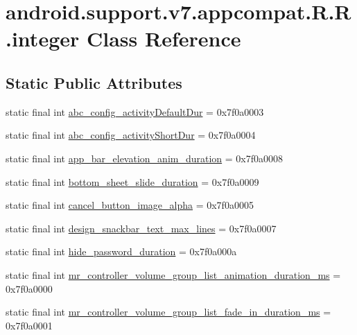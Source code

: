 \hypertarget{classandroid_1_1support_1_1v7_1_1appcompat_1_1_r_1_1integer}{
\section{android.support.v7.appcompat.R.R.integer Class Reference}
\label{classandroid_1_1support_1_1v7_1_1appcompat_1_1_r_1_1integer}
}
\subsection*{Static Public Attributes}
\begin{CompactItemize}
\item 
static final int \hyperlink{classandroid_1_1support_1_1v7_1_1appcompat_1_1_r_1_1integer_f3179c672ed6f17e5b76ba538b10bbd8}{abc\_\-config\_\-activityDefaultDur} = 0x7f0a0003
\item 
static final int \hyperlink{classandroid_1_1support_1_1v7_1_1appcompat_1_1_r_1_1integer_199e1cf937411d1077fac8e1bf773821}{abc\_\-config\_\-activityShortDur} = 0x7f0a0004
\item 
static final int \hyperlink{classandroid_1_1support_1_1v7_1_1appcompat_1_1_r_1_1integer_6e2a8706dfe0a7994482f85a407a47ef}{app\_\-bar\_\-elevation\_\-anim\_\-duration} = 0x7f0a0008
\item 
static final int \hyperlink{classandroid_1_1support_1_1v7_1_1appcompat_1_1_r_1_1integer_f9241fdb9204d08edf97eed474d79a49}{bottom\_\-sheet\_\-slide\_\-duration} = 0x7f0a0009
\item 
static final int \hyperlink{classandroid_1_1support_1_1v7_1_1appcompat_1_1_r_1_1integer_040b827424a99cd9db063513e1e36a93}{cancel\_\-button\_\-image\_\-alpha} = 0x7f0a0005
\item 
static final int \hyperlink{classandroid_1_1support_1_1v7_1_1appcompat_1_1_r_1_1integer_e3e76a674518ffb4240f729e3f8e05fc}{design\_\-snackbar\_\-text\_\-max\_\-lines} = 0x7f0a0007
\item 
static final int \hyperlink{classandroid_1_1support_1_1v7_1_1appcompat_1_1_r_1_1integer_99902b7e1f30f5e87fc2f6cecba4afb1}{hide\_\-password\_\-duration} = 0x7f0a000a
\item 
static final int \hyperlink{classandroid_1_1support_1_1v7_1_1appcompat_1_1_r_1_1integer_b0efd4e023761e7822d91a0afa7b121e}{mr\_\-controller\_\-volume\_\-group\_\-list\_\-animation\_\-duration\_\-ms} = 0x7f0a0000
\item 
static final int \hyperlink{classandroid_1_1support_1_1v7_1_1appcompat_1_1_r_1_1integer_64e63241c380353947e631d7c668e10e}{mr\_\-controller\_\-volume\_\-group\_\-list\_\-fade\_\-in\_\-duration\_\-ms} = 0x7f0a0001

\end{CompactItemize}

